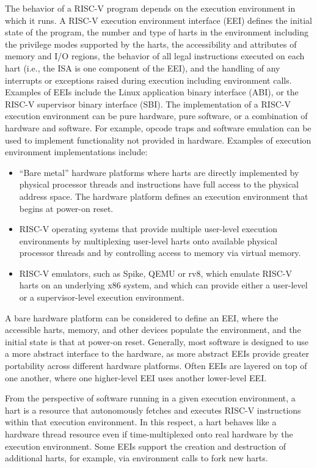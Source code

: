 The behavior of a RISC-V program depends on the execution environment
in which it runs.  A RISC-V execution environment interface (EEI)
defines the initial state of the program, the number and type of harts
in the environment including the privilege modes supported by the
harts, the accessibility and attributes of memory and I/O regions, the
behavior of all legal instructions executed on each hart (i.e., the
ISA is one component of the EEI), and the handling of any interrupts
or exceptions raised during execution including environment calls.
Examples of EEIs include the Linux application binary interface (ABI),
or the RISC-V supervisor binary interface (SBI).  The implementation
of a RISC-V execution environment can be pure hardware, pure software,
or a combination of hardware and software.  For example, opcode traps
and software emulation can be used to implement functionality not
provided in hardware.  Examples of execution environment
implementations include:
\begin{itemize}
  \item ``Bare metal'' hardware platforms where harts are directly
    implemented by physical processor threads and instructions have
    full access to the physical address space.  The hardware platform
    defines an execution environment that begins at power-on reset.
  \item RISC-V operating systems that provide multiple user-level
    execution environments by multiplexing user-level harts onto
    available physical processor threads and by controlling access to
    memory via virtual memory.
  \item RISC-V emulators, such as Spike, QEMU or rv8, which emulate
    RISC-V harts on an underlying x86 system, and which can provide
    either a user-level or a supervisor-level execution environment.
\end{itemize}

\begin{commentary}
  A bare hardware platform can be considered to define an EEI, where
  the accessible harts, memory, and other devices populate the
  environment, and the initial state is that at power-on reset.
  Generally, most software is designed to use a more abstract
  interface to the hardware, as more abstract EEIs provide greater
  portability across different hardware platforms.  Often EEIs are
  layered on top of one another, where one higher-level EEI uses
  another lower-level EEI.
\end{commentary}

From the perspective of software running in a given execution
environment, a hart is a resource that autonomously fetches and
executes RISC-V instructions within that execution environment.  In
this respect, a hart behaves like a hardware thread resource even if
time-multiplexed onto real hardware by the execution environment.
Some EEIs support the creation and destruction of additional harts,
for example, via environment calls to fork new harts.

